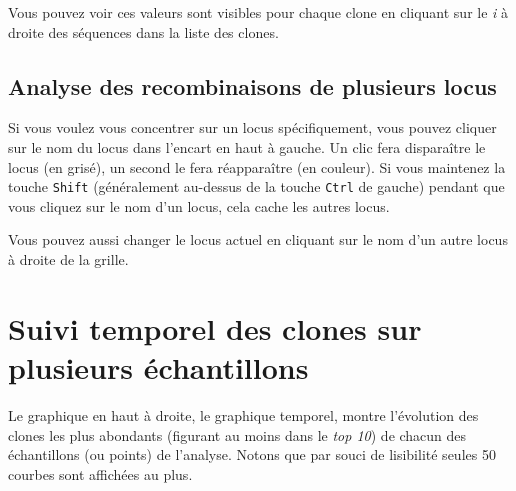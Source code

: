 \documentclass[10pt]{article}
\begin{document}
Vous pouvez voir ces valeurs sont visibles pour chaque clone en cliquant
sur le \textit{i} à droite des séquences dans la liste des clones.

\subsection{Analyse des recombinaisons de plusieurs locus}

Si vous voulez vous concentrer sur un locus spécifiquement, vous pouvez
cliquer sur le nom du locus dans l'encart en haut à gauche. Un clic fera
disparaître le locus (en grisé), un second le fera réapparaître (en
couleur). Si vous maintenez la touche \texttt{Shift} (généralement au-dessus de
la touche \texttt{Ctrl} de gauche) pendant que vous cliquez sur le nom d'un
locus, cela cache les autres locus.


Vous pouvez aussi changer le locus actuel en cliquant sur le nom d'un
autre locus à droite de la grille.

\newpage

\section{Suivi temporel des clones sur plusieurs échantillons}
\label{sec:tracking}


Le graphique en haut à droite, le graphique temporel, montre l'évolution des
clones les plus abondants (figurant au moins dans le \textit{top 10}) de chacun des
échantillons (ou points) de l'analyse.
Notons que par souci de lisibilité seules 50 courbes sont affichées au plus.

\end{document}
